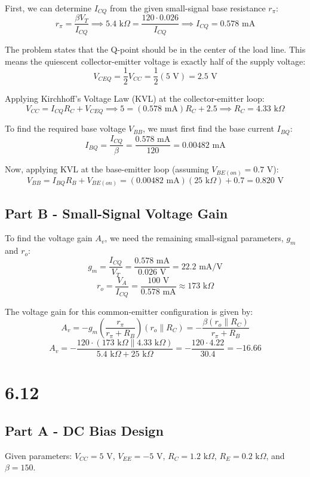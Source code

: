 \documentclass{article}
\begin{document}
First, we can determine $I_{CQ}$ from the given small-signal base resistance $r_\pi$:
$$ r_\pi = \frac{\beta V_T}{I_{CQ}} \implies 5.4 \text{ k}\Omega = \frac{120 \cdot 0.026}{I_{CQ}} \implies I_{CQ} = 0.578 \text{ mA} $$

The problem states that the Q-point should be in the center of the load line. This means the quiescent collector-emitter voltage is exactly half of the supply voltage:
$$ V_{CEQ} = \frac{1}{2} V_{CC} = \frac{1}{2} (5 \text{ V}) = 2.5 \text{ V} $$

Applying Kirchhoff's Voltage Law (KVL) at the collector-emitter loop:
$$ V_{CC} = I_{CQ} R_C + V_{CEQ} \implies 5 = (0.578 \text{ mA}) R_C + 2.5 \implies R_C = 4.33 \text{ k}\Omega $$

To find the required base voltage $V_{BB}$, we must first find the base current $I_{BQ}$:
$$ I_{BQ} = \frac{I_{CQ}}{\beta} = \frac{0.578 \text{ mA}}{120} = 0.00482 \text{ mA} $$

Now, applying KVL at the base-emitter loop (assuming $V_{BE(on)} = 0.7 \text{ V}$):
$$ V_{BB} = I_{BQ} R_B + V_{BE(on)} = (0.00482 \text{ mA})(25 \text{ k}\Omega) + 0.7 = 0.820 \text{ V} $$

\subsection{Part B - Small-Signal Voltage Gain}
To find the voltage gain $A_v$, we need the remaining small-signal parameters, $g_m$ and $r_o$:
$$ g_m = \frac{I_{CQ}}{V_T} = \frac{0.578 \text{ mA}}{0.026 \text{ V}} = 22.2 \text{ mA/V} $$
$$ r_o = \frac{V_A}{I_{CQ}} = \frac{100 \text{ V}}{0.578 \text{ mA}} \approx 173 \text{ k}\Omega $$

The voltage gain for this common-emitter configuration is given by:
$$ A_v = -g_m \left( \frac{r_\pi}{r_\pi + R_B} \right) (r_o \parallel R_C) = -\frac{\beta (r_o \parallel R_C)}{r_\pi + R_B} $$
$$ A_v = -\frac{120 \cdot (173 \text{ k}\Omega \parallel 4.33 \text{ k}\Omega)}{5.4 \text{ k}\Omega + 25 \text{ k}\Omega} = -\frac{120 \cdot 4.22}{30.4} = -16.66 $$

\pagebreak
\section{6.12}
\subsection{Part A - DC Bias Design}
Given parameters: $V_{CC} = 5 \text{ V}$, $V_{EE} = -5 \text{ V}$, $R_C = 1.2 \text{ k}\Omega$, $R_E = 0.2 \text{ k}\Omega$, and $\beta = 150$.
\end{document}
